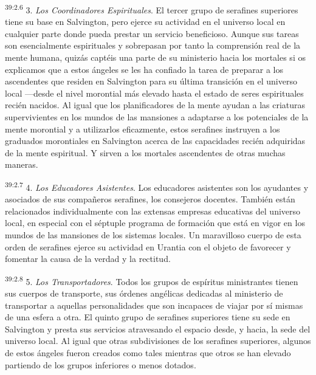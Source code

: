 \par
\textsuperscript{39:2.6} 3. \textit{Los Coordinadores Espirituales}. El tercer grupo de serafines superiores tiene su base en Salvington, pero ejerce su actividad en el universo local en cualquier parte donde pueda prestar un servicio beneficioso. Aunque sus tareas son esencialmente espirituales y sobrepasan por tanto la comprensión real de la mente humana, quizás captéis una parte de su ministerio hacia los mortales si os explicamos que a estos ángeles se les ha confiado la tarea de preparar a los ascendentes que residen en Salvington para su última transición en el universo local ---desde el nivel morontial más elevado hasta el estado de seres espirituales recién nacidos. Al igual que los planificadores de la mente ayudan a las criaturas supervivientes en los mundos de las mansiones a adaptarse a los potenciales de la mente morontial y a utilizarlos eficazmente, estos serafines instruyen a los graduados morontiales en Salvington acerca de las capacidades recién adquiridas de la mente espiritual. Y sirven a los mortales ascendentes de otras muchas maneras.

\par
\textsuperscript{39:2.7} 4. \textit{Los Educadores Asistentes}. Los educadores asistentes son los ayudantes y asociados de sus compañeros serafines, los consejeros docentes. También están relacionados individualmente con las extensas empresas educativas del universo local, en especial con el séptuple programa de formación que está en vigor en los mundos de las mansiones de los sistemas locales. Un maravilloso cuerpo de esta orden de serafines ejerce su actividad en Urantia con el objeto de favorecer y fomentar la causa de la verdad y la rectitud.

\par
\textsuperscript{39:2.8} 5. \textit{Los Transportadores}. Todos los grupos de espíritus ministrantes tienen sus cuerpos de transporte, sus órdenes angélicas dedicadas al ministerio de transportar a aquellas personalidades que son incapaces de viajar por sí mismas de una esfera a otra. El quinto grupo de serafines superiores tiene su sede en Salvington y presta sus servicios atravesando el espacio desde, y hacia, la sede del universo local. Al igual que otras subdivisiones de los serafines superiores, algunos de estos ángeles fueron creados como tales mientras que otros se han elevado partiendo de los grupos inferiores o menos dotados.

